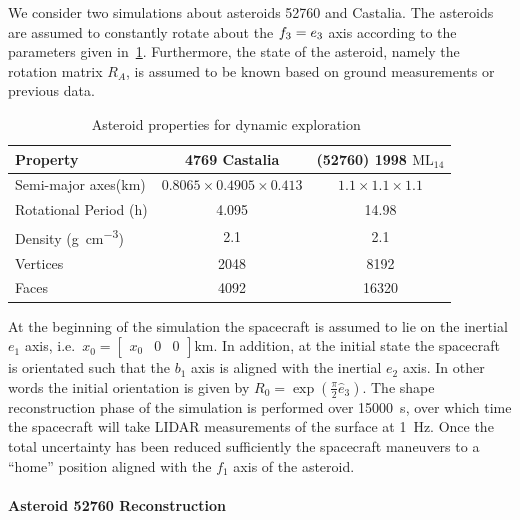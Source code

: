 \documentclass[letterpaper, paper,11pt]{AAS}		%
\begin{document}
We consider two simulations about asteroids \num{52760} and Castalia.
The asteroids are assumed to constantly rotate about the \( f_3 = e_3\) axis according to the parameters given in~\cref{tab:dynamic_asteroids}.
Furthermore, the state of the asteroid, namely the rotation matrix \( R_A \), is assumed to be known based on ground measurements or previous data.
\begin{table}[htbp]
    \centering
    \begin{tabular}{lcc}
        \toprule
        Property & \num{4769} Castalia & (\num{52760}) \num{1998} \(\text{ML}_{14}\) \\
        \midrule
        Semi-major axes(\si{\kilo\meter}) & \( 0.8065 \times 0.4905 \times 0.413 \) & \( 1.1 \times 1.1 \times 1.1 \) \\
        Rotational Period (\si{\hour}) & \num{4.095} & \num{14.98} \\
        Density (\si{\gram\per\centi\meter^3}) & \num{2.1} & \num{2.1} \\
        Vertices & \num{2048}  & \num{8192} \\
        Faces & \num{4092} & \num{16320} \\
        \bottomrule
    \end{tabular}
    \caption{Asteroid properties for dynamic exploration~\label{tab:dynamic_asteroids}}
\end{table}
At the beginning of the simulation the spacecraft is assumed to lie on the inertial \( e_1 \) axis, i.e.\ \( x_0 = \begin{bmatrix} x_0 & 0 & 0 \end{bmatrix} \si{\kilo\meter} \).
In addition, at the initial state the spacecraft is orientated such that the \( b_1 \) axis is aligned with the inertial \( e_2 \) axis.
In other words the initial orientation is given by \( R_0 = \exp(\frac{\pi}{2} \hat{e}_3)\).
The shape reconstruction phase of the simulation is performed over \SI{15000}{\second}, over which time the spacecraft will take LIDAR measurements of the surface at \SI{1}{\hertz}.
Once the total uncertainty has been reduced sufficiently the spacecraft maneuvers to a ``home'' position aligned with the \( f_1 \) axis of the asteroid.

\paragraph{Asteroid 52760 Reconstruction}
\end{document}
